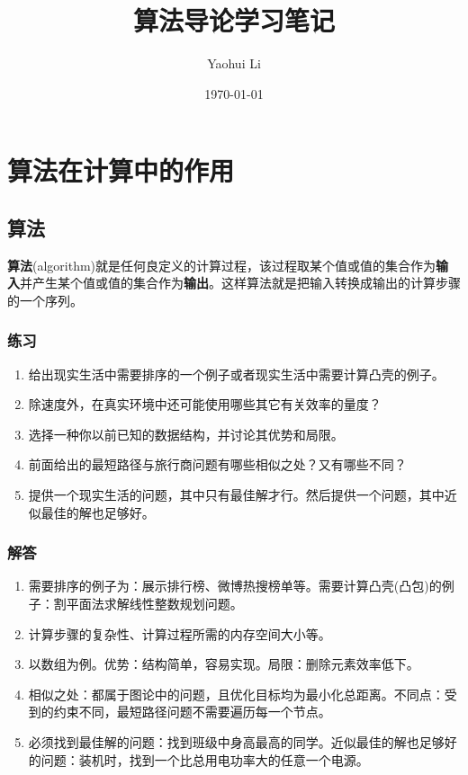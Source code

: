 \documentclass[UTF8,a4paper,zihao=-4,oneside,onecolumn,scheme=chinese,autoindent=true]{ctexbook}
\title{算法导论学习笔记}
\author{Yaohui Li}
\date{\today}
\begin{document}
\maketitle

\tableofcontents

\chapter{算法在计算中的作用}
\section{算法}
\textbf{算法}(algorithm)就是任何良定义的计算过程，该过程取某个值或值的集合作为\textbf{输入}并产生某个值或值的集合作为\textbf{输出}。这样算法就是把输入转换成输出的计算步骤的一个序列。

\subsection*{练习}
\begin{enumerate}
    \renewcommand{\labelenumi}{\thesection-\theenumi}
    \item 给出现实生活中需要排序的一个例子或者现实生活中需要计算凸壳的例子。
    \item 除速度外，在真实环境中还可能使用哪些其它有关效率的量度？
    \item 选择一种你以前已知的数据结构，并讨论其优势和局限。
    \item 前面给出的最短路径与旅行商问题有哪些相似之处？又有哪些不同？
    \item 提供一个现实生活的问题，其中只有最佳解才行。然后提供一个问题，其中近似最佳的解也足够好。
\end{enumerate}

\subsection*{解答}
\begin{enumerate}
    \renewcommand{\labelenumi}{\thesection-\theenumi}
    \item 需要排序的例子为：展示排行榜、微博热搜榜单等。需要计算凸壳(凸包)的例子：割平面法求解线性整数规划问题。
    \item 计算步骤的复杂性、计算过程所需的内存空间大小等。
    \item 以数组为例。优势：结构简单，容易实现。局限：删除元素效率低下。
    \item 相似之处：都属于图论中的问题，且优化目标均为最小化总距离。不同点：受到的约束不同，最短路径问题不需要遍历每一个节点。
    \item 必须找到最佳解的问题：找到班级中身高最高的同学。近似最佳的解也足够好的问题：装机时，找到一个比总用电功率大的任意一个电源。
\end{enumerate}
\end{document}
